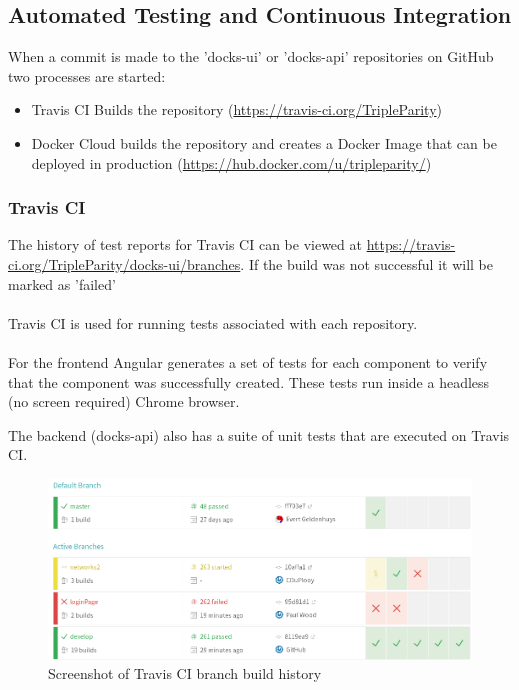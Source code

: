 \documentclass[]{article}
\begin{document}
\subsection{Automated Testing and Continuous Integration}
When a commit is made to the 'docks-ui' or 'docks-api' repositories on GitHub two
processes are started:
\begin{itemize}
	\item Travis CI Builds the repository (\url{https://travis-ci.org/TripleParity})
	\item Docker Cloud builds the repository and creates a Docker Image that can be deployed in production
	(\url{https://hub.docker.com/u/tripleparity/})
\end{itemize}

\subsubsection{Travis CI}
The history of test reports for Travis CI can be viewed at
\url{https://travis-ci.org/TripleParity/docks-ui/branches}.
If the build was not successful it will be marked as 'failed' \\
\\
Travis CI is used for running tests associated with each repository. \\
\\
For the frontend Angular generates a set of tests for each component to verify
that the component was successfully created. These tests run inside a
headless (no screen required) Chrome browser.

The backend (docks-api) also has a suite of unit tests that are executed on Travis CI.

\begin{figure}[H]
	\centering
	\includegraphics[scale=0.5]{travis_build_history.png}
	\caption{Screenshot of Travis CI branch build history}
\end{figure}
\end{document}
